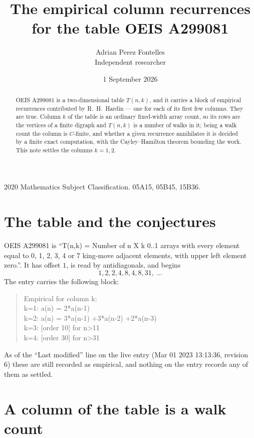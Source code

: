 \documentclass[11pt,a4paper]{article}
\title{The empirical column recurrences for the table OEIS A299081}
\author{Adrian Perez Fontelles\\ \small Independent researcher}
\date{1 September 2026}
\theoremstyle{plain}
\theoremstyle{definition}
\begin{document}
\maketitle

\begin{abstract}
OEIS A299081 is a two-dimensional table $T(n,k)$, and it carries a block of empirical
recurrences contributed by R.~H.~Hardin --- one for each of its first few columns. They are
true. Column $k$ of the table is an ordinary fixed-width array count, so its rows are the
vertices of a finite digraph and $T(n,k)$ is a number of walks in it; being a walk count the
column is $C$-finite, and whether a given recurrence annihilates it is decided by a finite
exact computation, with the Cayley--Hamilton theorem bounding the work. This note settles the columns $k=1, 2$.
\end{abstract}

\noindent\small 2020 Mathematics Subject Classification. 05A15, 05B45, 15B36.\normalsize

\section{The table and the conjectures}

OEIS A299081 is ``T(n,k) = Number of n X k 0..1 arrays with every element equal to 0, 1, 2, 3, 4 or 7 king-move adjacent elements, with upper left element zero.''. It has offset $1$, is
read by antidiagonals, and begins
\[
1, 2, 2, 4, 8, 4, 8, 31,\ \dots
\]
The entry carries the following block:
\begin{quote}\small
Empirical for column k:\\
k=1: a(n) = 2*a(n-1)\\
k=2: a(n) = 3*a(n-1) +3*a(n-2) +2*a(n-3)\\
k=3: [order 10] for n>11\\
k=4: [order 30] for n>31\\
\end{quote}
As of the ``Last modified'' line on the live entry (Mar 01 2023 13:13:36, revision 6) these are still
recorded as empirical, and nothing on the entry records any of them as settled.

\section{A column of the table is a walk count}
\end{document}
